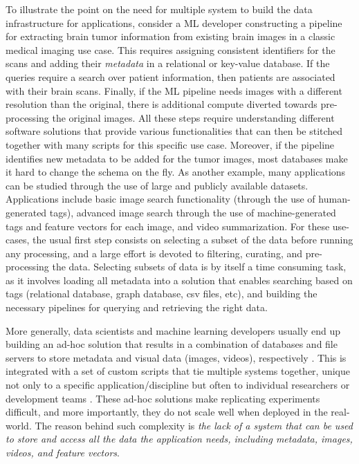 To illustrate the point on the need for multiple system to build the data
infrastructure for applications,
consider a ML developer constructing a pipeline for extracting
brain tumor information from existing brain images in a classic medical
imaging use case.
This requires assigning consistent identifiers for the scans and adding their
\textit{metadata} in a relational or key-value database\cite{kumar2017data}.
If the queries require a search over patient information,
then patients are associated with their brain scans.
Finally, if the ML pipeline needs images with a different resolution
than the original, there is additional compute
diverted towards pre-processing the original images.
All these steps require understanding different software
solutions that provide various functionalities that can then be stitched
together with many scripts for this specific use case.
Moreover, if the pipeline identifies new metadata to be added for
the tumor images, most databases make it hard to change the schema on the fly.
As another example, many applications can be studied through the use of large
and publicly available datasets.
Applications include basic image search functionality (through the use
of human-generated tags), advanced image search through the use of
machine-generated tags and feature vectors\cite{imagesearch, qin2020similarity}
for each image, and video summarization.
For these use-cases, the usual first step consists on selecting a
subset of the data before running any processing, and a large effort
is devoted to filtering, curating, and pre-processing the data.
Selecting subsets of data is by itself a time consuming task,
as it involves loading all metadata into a solution that enables searching
based on tags (relational database, graph database, csv files, etc), and
building the necessary pipelines for querying and retrieving the right data.

More generally, data scientists and machine learning developers
usually end up building an ad-hoc solution that results in a
combination of databases and file servers to store
metadata and visual data (images, videos), respectively \cite{sculley2015hidden}.
This is integrated with a set of custom scripts that tie multiple systems together,
unique not only to a specific application/discipline but often
to individual researchers or development teams
\cite{mayer2020scalable, sculley2015hidden}.
These ad-hoc solutions make replicating experiments difficult,
and more importantly, they do not scale well when deployed in the real-world.
The reason behind such complexity is \textit{the lack of a system
that can be used to store and access all the data the application needs,
including metadata, images, videos, and feature vectors}.

